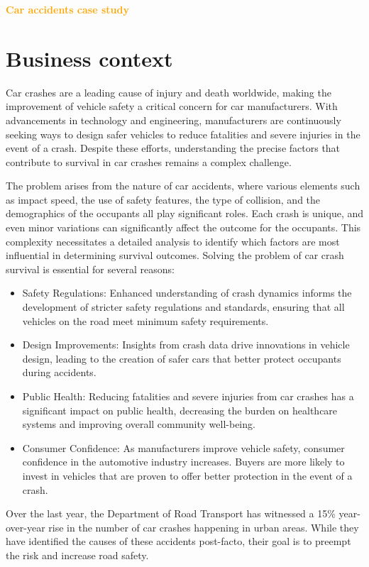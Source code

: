 \documentclass[12pt,a4paper]{article}
\begin{document}
	\tableofcontents
	\listoffigures
	\newpage
	\begin{center}
		\textcolor{orange}{\Large {\bf{Car accidents case study}}}
	\end{center}
	
	\section{Business context}
Car crashes are a leading cause of injury and death worldwide, making the improvement of vehicle safety a critical concern for car manufacturers. With advancements in technology and engineering, manufacturers are continuously seeking ways to design safer vehicles to reduce fatalities and severe injuries in the event of a crash. Despite these efforts, understanding the precise factors that contribute to survival in car crashes remains a complex challenge.

The problem arises from the nature of car accidents, where various elements such as impact speed, the use of safety features, the type of collision, and the demographics of the occupants all play significant roles. Each crash is unique, and even minor variations can significantly affect the outcome for the occupants. This complexity necessitates a detailed analysis to identify which factors are most influential in determining survival outcomes. Solving the problem of car crash survival is essential for several reasons:
\begin{itemize}
	\item Safety Regulations: Enhanced understanding of crash dynamics informs the development of stricter safety regulations and standards, ensuring that all vehicles on the road meet minimum safety requirements.
	\item Design Improvements: Insights from crash data drive innovations in vehicle design, leading to the creation of safer cars that better protect occupants during accidents.
	\item Public Health: Reducing fatalities and severe injuries from car crashes has a significant impact on public health, decreasing the burden on healthcare systems and improving overall community well-being.
	\item Consumer Confidence: As manufacturers improve vehicle safety, consumer confidence in the automotive industry increases. Buyers are more likely to invest in vehicles that are proven to offer better protection in the event of a crash.
\end{itemize}
Over the last year, the Department of Road Transport has witnessed a 15\% year-over-year rise in the number of car crashes happening in urban areas. While they have identified the causes of these accidents post-facto, their goal is to preempt the risk and increase road safety.
\end{document}
